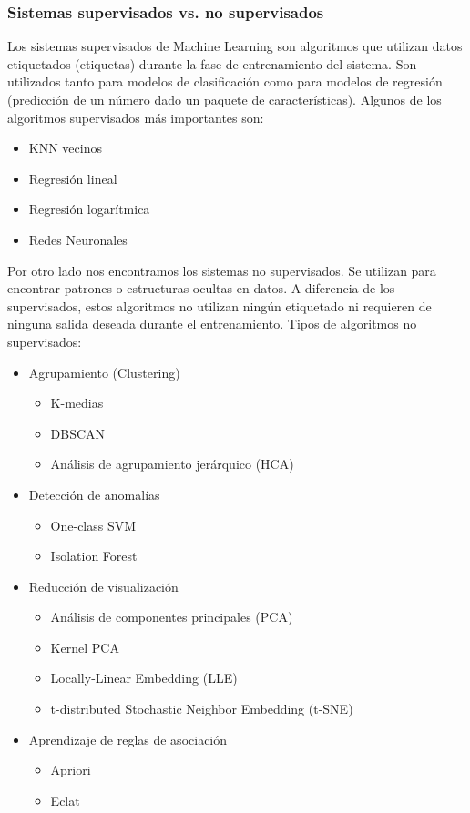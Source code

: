 \documentclass[12pt,a4paper,Spanish]{book}
\begin{document}
\subsubsection{Sistemas supervisados vs. no supervisados}
Los sistemas supervisados de Machine Learning son algoritmos que utilizan datos etiquetados (etiquetas) durante la fase de entrenamiento del sistema. Son utilizados tanto para modelos de clasificación como para modelos de regresión (predicción de un número dado un paquete de características). Algunos de los algoritmos supervisados más importantes son:
\begin{itemize}
	\item KNN vecinos
	\item Regresión lineal
	\item Regresión logarítmica
	\item Redes Neuronales	
\end{itemize}
Por otro lado nos encontramos los sistemas no supervisados. Se utilizan para encontrar patrones o estructuras ocultas en datos. A diferencia de los supervisados, estos algoritmos no utilizan ningún etiquetado ni requieren de ninguna salida deseada durante el entrenamiento. Tipos de algoritmos no supervisados:
\begin{itemize}
	\item Agrupamiento (Clustering)
	\begin{itemize}
		\item K-medias
		\item DBSCAN
		\item Análisis de agrupamiento jerárquico (HCA)	
	\end{itemize}
	\item Detección de anomalías
	\begin{itemize}
		\item One-class SVM
		\item Isolation Forest	
	\end{itemize}
	\item Reducción de visualización
	\begin{itemize}
		\item Análisis de componentes principales (PCA)
		\item Kernel PCA	
		\item Locally-Linear Embedding (LLE)
		\item t-distributed Stochastic Neighbor Embedding (t-SNE)
	\end{itemize}
	\item Aprendizaje de reglas de asociación
	\begin{itemize}
		\item Apriori
		\item Eclat	
	\end{itemize}	
\end{itemize}
\end{document}
